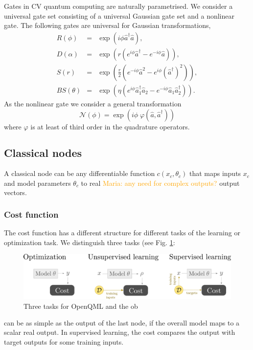\documentclass[aps,pra,10pt,twocolumn,groupedaddress,nofootinbib]{revtex4-1}
\theoremstyle{plain}
\renewcommand{\a}{\hat{a}}
\newcommand{\adag}{\hat{a}^{\dagger}}
\newcommand{\maria}[1]{\textcolor{orange}{Maria: #1}}
\begin{document}
Gates in CV quantum computing are naturally parametrised. We consider a universal gate set consisting of a universal Gaussian gate set and a nonlinear gate. The following gates are universal for Gaussian transformations, 
\begin{eqnarray}
  	R(\phi) & =& \exp\left(i \phi \adag \a \right), \\
  	D(\alpha) & =& \exp(r (e^{i\phi} \adag -e^{-i\phi} \a)), \\
  	S(r) & =& \exp \left(\frac{r}{2} \left(e^{-i\phi} \a^2 -e^{i\phi}  (\adag)^2 \right) \right), \\
  	BS(\theta) & =& \exp\left(\eta (e^{i \phi} \adag_1 \a_2 -e^{-i \phi}\a_1 \adag_2) \right).
  \label{Eq:gaussiangates}
\end{eqnarray}
As the nonlinear gate we consider a general transformation
\begin{equation}
	\mathcal{N}(\phi) = \exp(i \phi \; \varphi(\a, \adag))
	\label{Eq:nonlineargate}
\end{equation}
where $\varphi$ is at least of third order in the quadrature operators. 

\subsection{Classical nodes}

A classical node can be any differentiable function $c(x_c, \theta_c)$ that maps inputs $x_c$ and model parameters $\theta_c$ to real \maria{any need for complex outputs?} output vectors. 


\subsubsection{Cost function}
The cost function has a different structure for different tasks of the learning or optimization task. We distinguish three tasks (see Fig. \ref{Fig:tasks}:


\begin{figure}[t]
\includegraphics[scale=0.08]{tasks.pdf}
\caption{Three tasks for OpenQML and the ob}
\label{Fig:tasks}
\end{figure}

can be as simple as the output of the last node, if the overall model maps to a scalar real output. In supervised learning, the cost compares the output with target outputs for some training inputs. 
\end{document}
